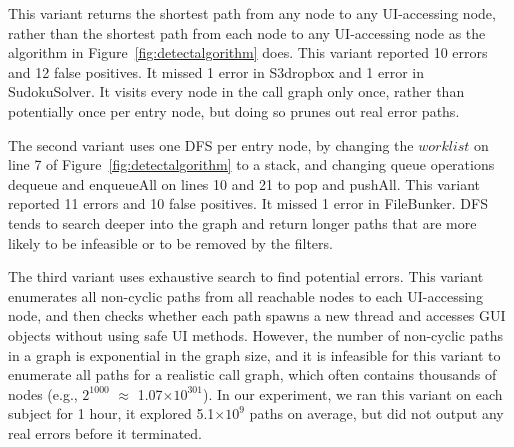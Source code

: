 \noindent This variant returns the shortest path from any  node
to any UI-accessing node, rather than the shortest path from each
 node to any UI-accessing node as the algorithm in
Figure~\ref{fig:detectalgorithm} does.
This variant reported 10 errors and 12 false positives.   It missed 1 error in S3dropbox and 1 error in
SudokuSolver.
It visits every node in the call graph only once, rather than potentially
once per entry node, but doing so prunes out real error paths.

The second variant uses one DFS per entry node, by changing
the $\mathit{worklist}$ on line 7 of Figure~\ref{fig:detectalgorithm} to
a stack, and changing queue operations dequeue and enqueueAll
on lines 10 and 21
to pop and pushAll.
This variant reported 11 errors and 10 false positives.  It missed 1 error in FileBunker.
DFS tends to search deeper into the graph and return longer paths that are
more likely to be infeasible or to be removed by the filters.

The third variant uses exhaustive search to find potential errors. This variant
enumerates all non-cyclic paths from all reachable  nodes
to each UI-accessing node, and then checks whether each
path spawns a new thread and accesses GUI objects without using safe UI methods.
However, the number of non-cyclic paths in a graph is exponential in the graph size,
and it is infeasible for this variant to enumerate all paths for a realistic
call graph, which often contains thousands of
nodes (e.g., $2^{1000}$ $\approx$ 1.07$\times$$10^{301}$). In our experiment,
we ran this variant on each subject for 1 hour, it explored 5.1$\times$$10^9$ paths on average, but did not
output any real errors before it terminated.



